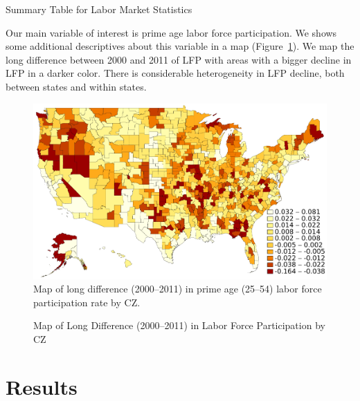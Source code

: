 \documentclass[12pt]{article}
\begin{document}
\begin{table}
    \scriptsize
    \centering
    \caption{Summary Table for Labor Market Statistics}
    
    \label{table:laborsumm}
\end{table}

Our main variable of interest is prime age labor force participation.  We shows some additional descriptives about this variable in a map (Figure~\ref{figure:lfpmap}).  We map the long difference between 2000 and 2011 of LFP with areas with a bigger decline in LFP in a darker color.  There is considerable heterogeneity in LFP decline, both between states and within states.

\begin{figure}[htbp]
    \centering
    \caption{Map of Long Difference (2000--2011) in Labor Force Participation by CZ}
    \begin{minipage}{\textwidth}
    \includegraphics[width=\textwidth]{figs/map_lfpdiff.pdf}
    \footnotesize
    Map of long difference (2000--2011) in prime age (25--54) labor force participation rate by CZ\@.
    \end{minipage}
    \label{figure:lfpmap}
\end{figure}

\section{Results} \label{results}
\end{document}

